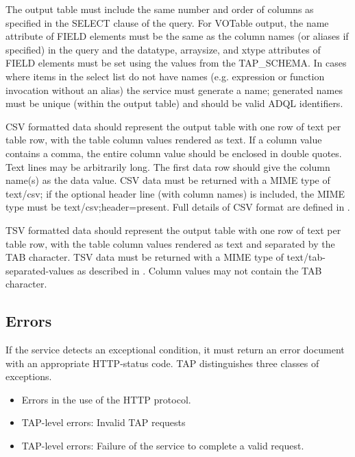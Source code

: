 \documentclass[11pt,letter]{ivoa}
\newcommand{\tapschema}{TAP\_SCHE\-MA}
\newcommand{\tapschema}{\mbox{%
  \relsize{-0.5}TAP\discretionary{-}{}{\kern-2pt\_}SCHEMA}}
\begin{document}
The output table must include the same number and order of columns as specified 
in the SELECT clause of the query. For VOTable output, the name attribute of 
FIELD elements must be the same as the column names (or aliases if specified)  
in the query and the datatype, arraysize, and xtype 
attributes of FIELD elements must be set using the values from the \tapschema. 
In cases where items in the select list do not 
have names (e.g. expression or function invocation without an alias) the service 
must generate a name; 
generated names must be unique (within the output table) and should be valid 
ADQL identifiers.

CSV formatted data should represent the output table with one row of text per 
table row, with the table column values rendered as text. 
If a column value contains a comma, the entire column value should be 
enclosed in double quotes.  Text lines may be arbitrarily long.  The first data 
row should give the column name(s) as the data value.   CSV data must be returned 
with a MIME type of text/csv; if the optional header line (with column names) 
is included, the MIME type must be text/csv;header=present. Full details of CSV 
format are defined in \citet{std:CSV}.

TSV formatted data should represent the output table with one row of text per 
table row, with the table column values rendered as text and separated by the 
TAB character. TSV data must be returned with a MIME type of 
text/tab-separated-values as described in
\citet{std:TSV}. Column values may not contain the 
TAB 
character.

\subsection{Errors}
\label{sec:query-error}

If the service detects an exceptional condition, it must return an error 
document with an appropriate HTTP-status code. TAP distinguishes three classes 
of exceptions.

\begin{itemize}
\item Errors in the use of the HTTP protocol. 

\item TAP-level errors: Invalid TAP requests

\item TAP-level errors: Failure of the service to complete a valid request.
\end{itemize}
\end{document}
